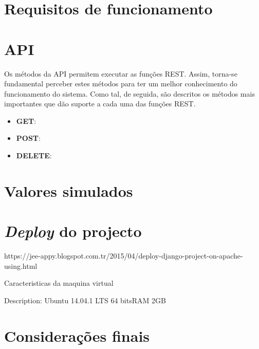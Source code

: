 \newpage

\section{Requisitos de funcionamento}


\newpage


\section{API}

Os métodos da API permitem executar as funções REST. Assim, torna-se fundamental perceber estes métodos para ter um melhor conhecimento do funcionamento do sistema. Como tal, de seguida, são descritos os métodos mais importantes que dão suporte a cada uma das funções REST.

\begin{itemize}
	\item \textbf{GET}: 
	\item \textbf{POST}: 
	\item \textbf{DELETE}: 
\end{itemize}





\section{Valores simulados}



\section{\textit{Deploy} do projecto}


https://jee-appy.blogspot.com.tr/2015/04/deploy-django-project-on-apache-using.html

Caracteristicas da maquina virtual

Description:	Ubuntu 14.04.1 LTS
64 bitsRAM 2GB 

\section{Considerações finais}








